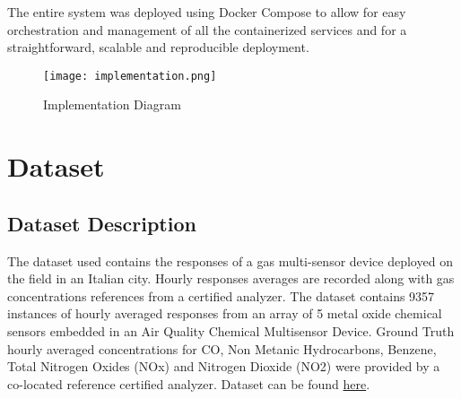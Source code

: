 The entire system was deployed using Docker Compose to allow for easy orchestration and management of all the containerized services and for a straightforward, scalable and reproducible deployment.

\begin{figure}[!h]
    \graphicspath{ {./diagrams/} }
    \texttt{[image: implementation.png]}
    \centering
    \caption{Implementation Diagram}
    \label{fig:imple_dia}
\end{figure}

\section{Dataset}
\subsection{Dataset Description}
The dataset used contains the responses of a gas multi-sensor device deployed on the field in an Italian city. Hourly responses averages are recorded along with gas concentrations references from a certified analyzer. The dataset contains 9357 instances of hourly averaged responses from an array of 5 metal oxide chemical sensors embedded in an Air Quality Chemical Multisensor Device. Ground Truth hourly averaged concentrations for CO, Non Metanic Hydrocarbons, Benzene, Total Nitrogen Oxides (NOx) and Nitrogen Dioxide (NO2) were provided by a co-located reference certified analyzer. Dataset can be found \href{https://www.kaggle.com/datasets/fedesoriano/air-quality-data-set/data}{here}.


